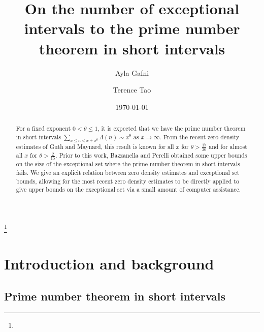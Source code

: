 \documentclass[12pt]{amsart}
\begin{document}

\title{On the number of exceptional intervals to the prime number theorem in short intervals}

\author[Gafni]{Ayla Gafni}
\address{Department of Mathematics, University of Mississippi, University MS 38677}
\author[Tao]{Terence Tao}
\address{Department of Mathematics, UCLA, 405 Hilgard Ave, Los Angeles CA 90024}



\keywords{}
\subjclass[2020]{}
\thanks{}


\date{\today}

\begin{abstract} For a fixed exponent $0 < \theta \leq 1$, it is expected that we have the prime number theorem in short intervals $\sum_{x \leq n < x+x^\theta} \Lambda(n) \sim x^\theta$ as $x \to \infty$.  From the recent zero density estimates of Guth and Maynard, this result is known for all $x$ for $\theta > \frac{17}{30}$ and for almost all $x$ for $\theta > \frac{2}{15}$.  Prior to this work, Bazzanella and Perelli obtained some upper bounds on the size of the exceptional set where the prime number theorem in short intervals fails.  We give an explicit relation between zero density estimates and exceptional set bounds, allowing for the most recent zero density estimates to be directly applied to give upper bounds on the exceptional set via a small amount of computer assistance.
\end{abstract}

\maketitle

\section{Introduction and background} \label{intro}

\subsection{Prime number theorem in short intervals}
\end{document}
